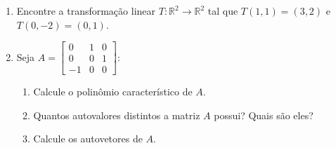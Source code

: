 \documentclass{article}
\begin{document}
\begin{enumerate}
\item Encontre a transforma\c{c}\~ao linear $T:\mathbb{R}^2 \rightarrow \mathbb{R}^2$
	tal que $T(1, 1) = (3, 2)$ e $T(0, -2) = (0, 1)$.

\item Seja
$A=\left[\begin{array}{ccc}
	0 & 1 & 0 \\
	0 & 0 & 1 \\
	-1 & 0 & 0
\end{array}\right]$:
\begin{enumerate}
	\item Calcule o polin\^omio caracter\'istico de $A$.
	\item Quantos autovalores distintos a matriz $A$ possui? Quais s\~ao eles?
	\item Calcule os autovetores de $A$.
\end{enumerate}

\end{enumerate}
\end{document}
